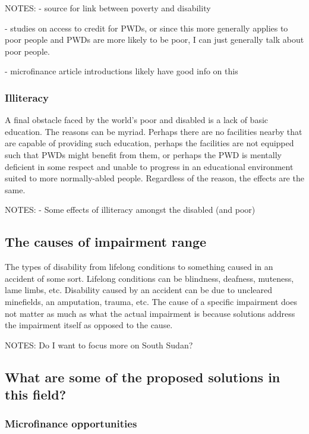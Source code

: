 \documentclass{lps}
\begin{document}
NOTES: 
- source for link between poverty and disability

- studies on access to credit for PWDs, or since this more generally applies
to poor people and PWDs are more likely to be poor, I can just generally talk
about poor people.

- microfinance article introductions likely have good info on this

\subsubsection{Illiteracy}

A final obstacle faced by the world’s poor and disabled is a lack of basic
education. The reasons can be myriad. Perhaps there are no facilities nearby
that are capable of providing such education, perhaps the facilities are not
equipped such that PWDs might benefit from them, or perhaps the PWD is
mentally deficient in some respect and unable to progress in an educational
environment suited to more normally-abled people. Regardless of the reason,
the effects are the same.

NOTES:
- Some effects of illiteracy amongst the disabled (and poor)

\subsection{The causes of impairment range }

The types of disability from lifelong conditions to something caused in an
accident of some sort. Lifelong conditions can be blindness, deafness,
muteness, lame limbs, etc. Disability caused by an accident can be due to
uncleared minefields, an amputation, trauma, etc. The cause of a specific
impairment does not matter as much as what the actual impairment is because
solutions address the impairment itself as opposed to the cause. 

NOTES:
Do I want to focus more on South Sudan?

\subsection{What are some of the proposed solutions in this field?}

\subsubsection{Microfinance opportunities}
\end{document}
